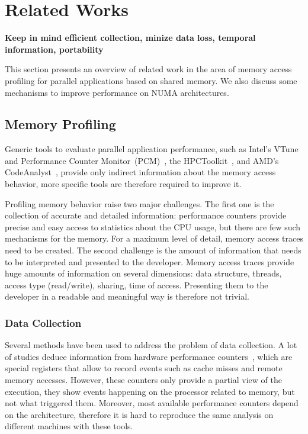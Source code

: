 
\section{Related Works}
\label{sec:related}

\textbf{Keep in mind efficient collection, minize data loss, temporal
information, portability}

This section presents an overview of related work in the area of memory access
profiling for parallel applications based on shared memory.
We also discuss some mechanisms to improve performance on NUMA architectures.

\subsection{Memory Profiling}
\label{sec:related-profiling}

Generic tools to evaluate parallel application performance, such as Intel's
VTune~\cite{Reinders05VTune} and Performance Counter
Monitor~(PCM)~\cite{Intel2012b}, the HPCToolkit~\cite{Adhianto10HPCTOOLKIT},
and AMD's CodeAnalyst~\cite{Drongowski2008}, provide only indirect information
about the memory access behavior, more specific tools are therefore required to improve it.

Profiling memory behavior raise two major challenges.
The first one is the collection of accurate and detailed information: performance counters provide precise and easy access to statistics about the CPU usage, but there are few such mechanisms for the memory.
For a maximum level of detail, memory access traces need to be created.
The second challenge is the amount of information that needs to be interpreted and presented to the developer.
Memory access traces provide huge amounts of information on several
dimensions: data structure, threads, access type (read/write), sharing, time of access.
Presenting them to the developer in a readable and meaningful way is therefore not trivial.

\subsubsection{Data Collection}

Several methods have been used to address the problem of data collection. A
lot of studies deduce information from hardware performance
counters~\cite{Majo13(Mis)understanding,
Jiang14Understanding,Bosch00Rivet,Weyers14Visualization,Tao01Visualizing,DeRose01Hardware},
which are special registers that allow to record events such as cache misses and remote
memory accesses. However, these counters only provide a partial
view of the execution, they show events happening on the processor related to
memory, but not what triggered them. Moreover, most available performance counters
depend on the architecture, therefore it is hard to reproduce the same
analysis on different machines with these tools.

